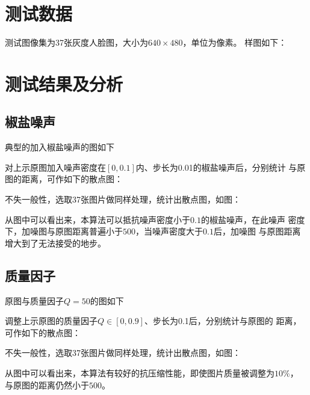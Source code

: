 \section{测试数据}
\label{sec:benchmark-data}

测试图像集为37张灰度人脸图，大小为$640 \times 480$，单位为像素。
样图如下：


\section{测试结果及分析}
\label{sec:result-and-analysis}

\subsection{椒盐噪声}
\label{sec:speckle-data}

典型的加入椒盐噪声的图如下

对上示原图加入噪声密度在$[0, 0.1]$内、步长为0.01的椒盐噪声后，分别统计
与原图的距离，可作如下的散点图：

不失一般性，选取37张图片做同样处理，统计出散点图，如图：

从图中可以看出来，本算法可以抵抗噪声密度小于$0.1$的椒盐噪声，在此噪声
密度下，加噪图与原图距离普遍小于$500$，当噪声密度大于$0.1$后，加噪图
与原图距离增大到了无法接受的地步。

\subsection{质量因子}
\label{sec:quality-data}

原图与质量因子$Q = 50$的图如下

调整上示原图的质量因子$Q \in [0, 0.9]$、步长为0.1后，分别统计与原图的
距离，可作如下的散点图：

不失一般性，选取37张图片做同样处理，统计出散点图，如图：

从图中可以看出来，本算法有较好的抗压缩性能，即使图片质量被调整为$10\%$，
与原图的距离仍然小于$500$。


